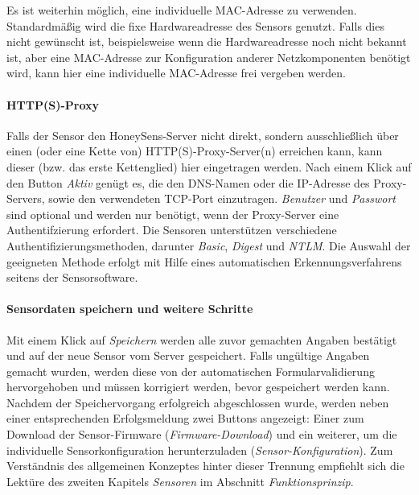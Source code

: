 \documentclass[12pt]{article}
\begin{document}
Es ist weiterhin möglich, eine individuelle MAC-Adresse zu verwenden. Standardmäßig wird die fixe Hardwareadresse des Sensors genutzt. Falls dies nicht gewünscht ist, beispielsweise wenn die Hardwareadresse noch nicht bekannt ist, aber eine MAC-Adresse zur Konfiguration anderer Netzkomponenten benötigt wird, kann hier eine individuelle MAC-Adresse frei vergeben werden.

\paragraph{HTTP(S)-Proxy}
Falls der Sensor den HoneySens-Server nicht direkt, sondern ausschließlich über einen (oder eine Kette von) HTTP(S)-Proxy-Server(n) erreichen kann, kann dieser (bzw. das erste Kettenglied) hier eingetragen werden. Nach einem Klick auf den Button \textit{Aktiv} genügt es, die den DNS-Namen oder die IP-Adresse des Proxy-Servers, sowie den verwendeten TCP-Port einzutragen. \textit{Benutzer} und \textit{Passwort} sind optional und werden nur benötigt, wenn der Proxy-Server eine Authentifzierung erfordert. Die Sensoren unterstützen verschiedene Authentifizierungsmethoden, darunter \textit{Basic}, \textit{Digest} und \textit{NTLM}. Die Auswahl der geeigneten Methode erfolgt mit Hilfe eines automatischen Erkennungsverfahrens seitens der Sensorsoftware.

\paragraph{Sensordaten speichern und weitere Schritte}
Mit einem Klick auf \textit{Speichern} werden alle zuvor gemachten Angaben bestätigt und auf der neue Sensor vom Server gespeichert. Falls ungültige Angaben gemacht wurden, werden diese von der automatischen Formularvalidierung hervorgehoben und müssen korrigiert werden, bevor gespeichert werden kann. Nachdem der Speichervorgang erfolgreich abgeschlossen wurde, werden neben einer entsprechenden Erfolgsmeldung zwei Buttons angezeigt: Einer zum Download der Sensor-Firmware (\textit{Firmware-Download}) und ein weiterer, um die individuelle Sensorkonfiguration herunterzuladen (\textit{Sensor-Konfiguration}). Zum Verständnis des allgemeinen Konzeptes hinter dieser Trennung empfiehlt sich die Lektüre des zweiten Kapitels \textit{Sensoren} im Abschnitt \textit{Funktionsprinzip}.
\end{document}
